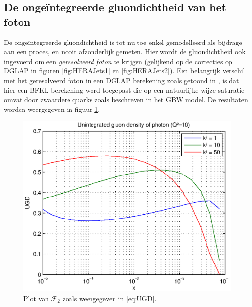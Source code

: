 \documentclass[a4paper,11pt]{article}
\numberwithin{equation}{section} %
\begin{document}
  \subsection{De ongeïntegreerde gluondichtheid van het foton} \label{sec:ResUGD}
De ongeïntegreerde gluondichtheid is tot nu toe enkel gemodelleerd als bijdrage aan een proces, en nooit afzonderlijk gemeten.
Hier wordt de gluondichtheid ook ingevoerd om een \textit{geresolveerd foton} te krijgen (gelijkend op de correcties op DGLAP in figuren \ref{fig:HERAJets1} en \ref{fig:HERAJets2}).
Een belangrijk verschil met het geresolveerd foton in een DGLAP berekening zoals getoond in \cite{Kiesling}, is dat hier een BFKL berekening word toegepast die op een natuurlijke wijze saturatie omvat door zwaardere quarks zoals beschreven in het GBW model.
De resultaten worden weergegeven in figuur \ref{fig:ResUGD}.
\begin{figure} [H]
  \begin{center}
    \includegraphics[scale=1]{Afbeeldingen/plotUGD.eps}
    \caption{Plot van $\mathcal{F}_2$ zoals weergegeven in \eqref{eq:UGD}.}
   \label{fig:ResUGD}
  \end{center}
\end{figure}
\end{document}
